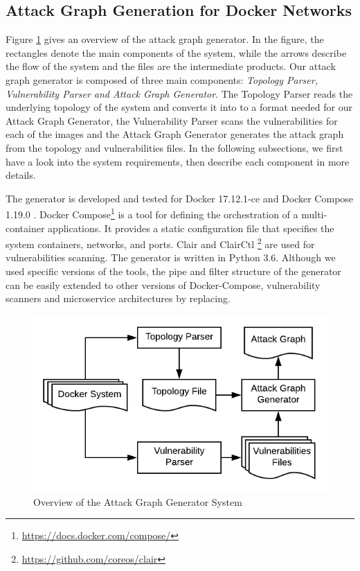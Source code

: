 \subsection{Attack Graph Generation for Docker Networks}
\label{chap:technical}

 Figure \ref{AttackGraphSystem} gives an overview of the attack graph generator. In the figure, the rectangles denote the main components of the system, while the arrows describe the flow of the system and the files are the intermediate products. Our attack graph generator is composed of three main components: \textit{Topology Parser, Vulnerability Parser and Attack Graph Generator}. The Topology Parser reads the underlying topology of the system and converts it into to a format needed for our Attack Graph Generator, the Vulnerability Parser scans the vulnerabilities for each of the images and the Attack Graph Generator generates the attack graph from the topology and vulnerabilities files. In the following subsections, we first have a look into the system requirements, then describe each component in more details.

The generator is developed and tested for Docker 17.12.1-ce and Docker Compose 1.19.0 \cite{merkel2014docker}. Docker Compose\footnote{\url{https://docs.docker.com/compose/}} is a tool for defining the orchestration of a multi-container applications. It provides a static configuration file that specifies the system containers, networks, and ports. Clair and ClairCtl \footnote{\url{https://github.com/coreos/clair}}  are used for vulnerabilities scanning. The generator is written in Python 3.6. Although we used  specific versions of the tools, the pipe and filter structure of the generator can be easily extended to other versions of Docker-Compose, vulnerability scanners and microservice architectures by replacing.


\begin{figure}
	\includegraphics[scale=0.9]{./images/AttackGraphSystem}
	\caption{Overview of the Attack Graph Generator System}
	\label{AttackGraphSystem}
\end{figure}

